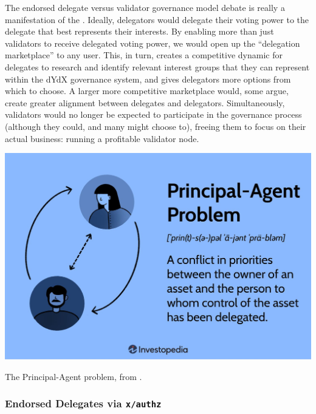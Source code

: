         The endorsed delegate versus validator governance model debate is really a manifestation of the . Ideally, delegators would delegate their voting power to the delegate that best represents their interests. By enabling more than just validators to receive delegated voting power, we would open up the ``delegation marketplace'' to any user. This, in turn, creates a competitive dynamic for delegates to research and identify relevant interest groups that they can represent within the dYdX governance system, and gives delegators more options from which to choose. A larger more competitive marketplace would, some argue, create greater alignment between delegates and delegators. Simultaneously, validators would no longer be expected to participate in the governance process (although they could, and many might choose to), freeing them to focus on their actual business: running a profitable validator node. 

        \begin{marginfigure}
            \centering
            \includegraphics[width=\linewidth]{figs/principal_agent.jpg}
            \caption{The Principal-Agent problem, from .}
            \label{fig:enter-label}
        \end{marginfigure}

        \subsubsection{Endorsed Delegates via \texttt{x/authz}}

